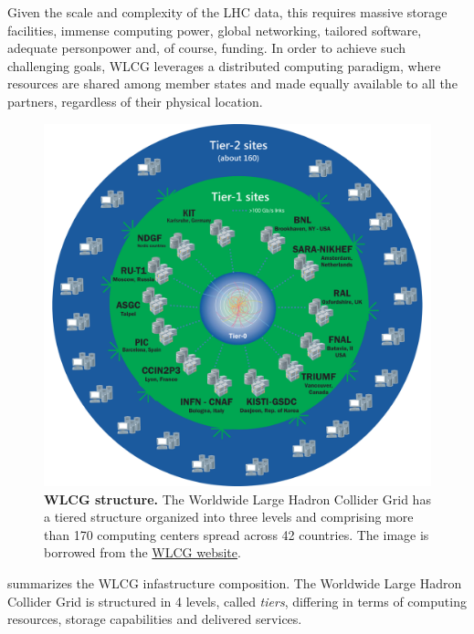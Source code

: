 Given the scale and complexity of the LHC data, this requires massive storage facilities, immense computing power, global networking, tailored software, adequate personpower and, of course, funding.
In order to achieve such challenging goals, WLCG leverages a distributed computing paradigm, where resources are shared among member states and made equally available to all the partners, regardless of their physical location.
\begin{figure}
    \centering
    \includegraphics[width=\textwidth]{figures/220_introduction/WLCG-Tiers-2021_v3.png}
    \caption{\textbf{WLCG structure.} The Worldwide Large Hadron Collider Grid has a tiered structure organized into three levels and comprising more than 170 computing centers spread across 42 countries.
    The image is borrowed from the \href{https://wlcg-public.web.cern.ch/sites/default/files/inline-images/WLCG-Tiers-2021_v3.png}{WLCG website}.
    } \label{fig:wlcg}
\end{figure}
 summarizes the WLCG infastructure composition. 
The Worldwide Large Hadron Collider Grid is structured in 4 levels, called \textit{tiers}, differing in terms of computing resources, storage capabilities and delivered services. 
